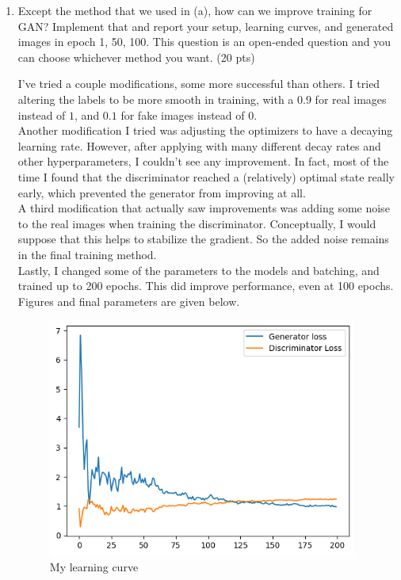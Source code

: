 \documentclass[a4paper]{article}
\theoremstyle{definition}
\newenvironment{soln}{
	\leavevmode\color{blue}\ignorespaces
}{}
\begin{document}
\begin{enumerate} [label=(\alph*)]
		\item Except the method that we used in (a), how can we improve training for GAN? Implement that and report your setup, learning curves, and generated images in epoch 1, 50, 100.
        This question is an open-ended question and you can choose whichever method you want.
		\hfill (20 pts)
		
		\begin{soln}
			I've tried a couple modifications, some more successful than others. I tried altering the labels to be more smooth in training, with a $0.9$ for real images instead of $1$, and $0.1$ for fake images instead of $0$. \\
			Another modification I tried was adjusting the optimizers to have a decaying learning rate. However, after applying with many different decay rates and other hyperparameters, I couldn't see any improvement. In fact, most of the time I found that the discriminator reached a (relatively) optimal state really early, which prevented the generator from improving at all. \\
			A third modification that actually saw improvements was adding some noise to the real images when training the discriminator. Conceptually, I would suppose that this helps to stabilize the gradient. So the added noise remains in the final training method. \\
			Lastly, I changed some of the parameters to the models and batching, and trained up to 200 epochs. This did improve performance, even at 100 epochs. Figures and final parameters are given below.
			
			\begin{figure}[H]
				\centering
				\includegraphics[width=4in]{1c_curve.png}
				\caption{My learning curve}
				\label{fig:gan_q1_loss}
			\end{figure}
			

\end{soln}
\end{enumerate}
\end{document}
